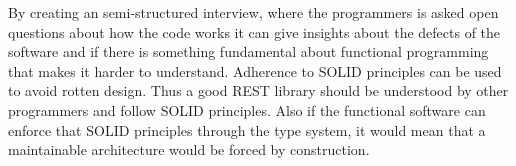 By creating an semi-structured interview, where the programmers is asked open
questions about how the code works it can give insights about the defects of
the software and if there is something fundamental about functional programming
that makes it harder to understand. Adherence to SOLID principles can be used
to avoid rotten design. Thus a good REST library should be understood by
other programmers and follow SOLID principles. Also if the functional software
can enforce that SOLID principles through the type system, it would mean that a
maintainable architecture would be forced by construction.
